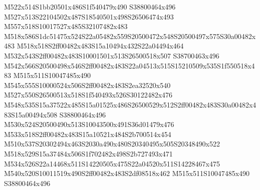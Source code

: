 \documentclass{article}
\begin{document}
\begin{multicols}{2}
M522x514S1bb20501x486S1f540479x490 S38800464x496 M527x513S22104502x487S18540501x498S26506474x493 M557x518S10017527x485S32107482x483 M518x586S1dc51475x524S22a05482x559S20500472x548S20500497x575S30a00482x483 M518x518S2ff00482x483S15a10494x432S22a04494x464 M532x543S2ff00482x483S10001501x513S26500518x507 S38700463x496 M542x566S20500498x546S2ff00482x483S22a04513x515S15210509x535S1f550518x483 M515x511S10047485x490 M545x555S10000524x506S2ff00482x483S2ea32520x540 M527x550S26500513x518S1f540493x526S30122482x476 M548x535S15a37522x485S15a01525x486S26500529x512S2ff00482x483S30a00482x483S15a00494x508 S38800464x496 M530x524S20500490x513S10043500x491S36d01479x476 M533x518S2ff00482x483S15a10521x484S2b700514x454 M510x537S20302494x463S2030a490x480S20340495x505S20348490x522 M518x529S15a37484x506S1f702482x498S2b727493x471 M534x526S22a14468x511S14220505x475S22a04520x511S14228467x475 M540x520S10011519x490S2ff00482x483S2df08518x462 M515x511S10047485x490 S38800464x496


\end{multicols}
\end{document}

